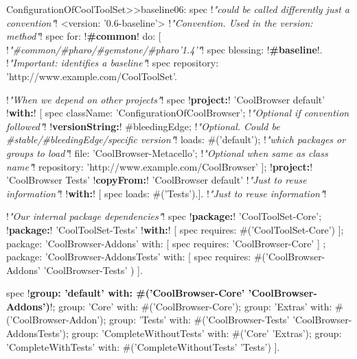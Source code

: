 \documentclass[a4paper,10pt,twoside]{book}
\begin{document}
\begin{footnotesize}
\begin{code}{}
ConfigurationOfCoolToolSet>>baseline06: spec 						!\emph{"could be called differently just a convention"}!
       <version: '0.6-baseline'> 						                        !\emph{"Convention. Used in the version: method"}!
       spec for: !\textbf{\#common}! do: [                                    !\emph{"\#common/\#pharo/\#gemstone/\#pharo'1.4'"}!
              spec blessing: !\textbf{\#baseline}!.				                       !\emph{"Important: identifies a baseline"}!
              spec repository: 'http://www.example.com/CoolToolSet'.

              !\emph{"When we depend on other projects"}!
              spec !\textbf{project:}! 'CoolBrowser default' !\textbf{with:}! [
                        spec
                            className: 'ConfigurationOfCoolBrowser';           !\emph{"Optional if convention followed"}!
                            !\textbf{versionString:}! #bleedingEdge;	!\emph{"Optional. Could be \#stable/\#bleedingEdge/specific version"}!
                            loads: #('default');			           	!\emph{"which packages or groups to load"}!
                            file: 'CoolBrowser-Metacello';               !\emph{"Optional when same as class name"}!
                            repository: 'http://www.example.com/CoolBrowser' ];
                     !\textbf{project:}! 'CoolBrowser Tests'
                            !\textbf{copyFrom:}! 'CoolBrowser default'       !\emph{"Just to reuse information"}!
                            !\textbf{with:}! [ spec loads: #('Tests').].             !\emph{"Just to reuse information"}!

             !\emph{"Our internal package dependencies"}!
              spec
                 !\textbf{package:}! 'CoolToolSet-Core';
                 !\textbf{package:}! 'CoolToolSet-Tests' !\textbf{with:}! [ spec requires: #('CoolToolSet-Core') ];
                 package: 'CoolBrowser-Addons' with: [ spec requires: 'CoolBrowser-Core' ] ;
                 package: 'CoolBrowser-AddonsTests' with: [
                      spec requires: #('CoolBrowser-Addons' 'CoolBrowser-Tests' ) ].

      		 spec
                 !\textbf{group: 'default' with: \#('CoolBrowser-Core' 'CoolBrowser-Addons')}!;
                 group: 'Core' with: #('CoolBrowser-Core');
                 group: 'Extras' with: #('CoolBrowser-Addon');
                 group: 'Tests' with: #('CoolBrowser-Tests' 'CoolBrowser-AddonsTests');
                 group: 'CompleteWithoutTests' with: #('Core' 'Extras');
                 group: 'CompleteWithTests' with: #('CompleteWithoutTests' 'Tests')
          ].
\end{code}\end{footnotesize}
\end{document}
